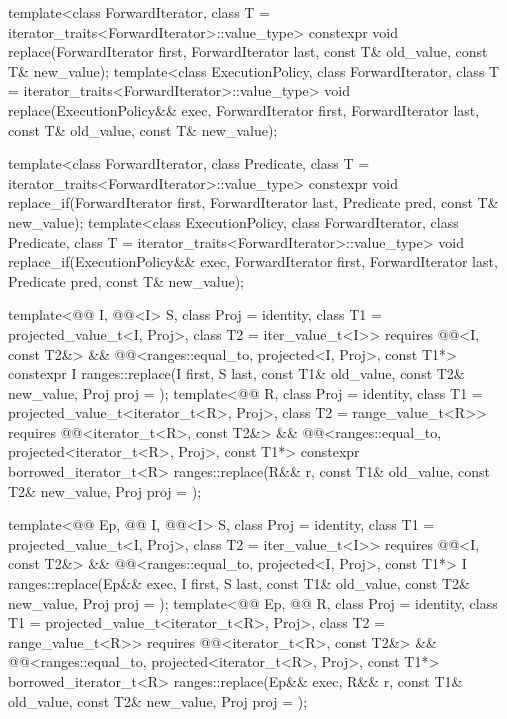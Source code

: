 %
%
\begin{itemdecl}
template<class ForwardIterator, class T = iterator_traits<ForwardIterator>::value_type>
  constexpr void replace(ForwardIterator first, ForwardIterator last,
                         const T& old_value, const T& new_value);
template<class ExecutionPolicy, class ForwardIterator,
         class T = iterator_traits<ForwardIterator>::value_type>
  void replace(ExecutionPolicy&& exec,
               ForwardIterator first, ForwardIterator last,
               const T& old_value, const T& new_value);

template<class ForwardIterator, class Predicate,
         class T = iterator_traits<ForwardIterator>::value_type>
  constexpr void replace_if(ForwardIterator first, ForwardIterator last,
                            Predicate pred, const T& new_value);
template<class ExecutionPolicy, class ForwardIterator, class Predicate,
         class T = iterator_traits<ForwardIterator>::value_type>
  void replace_if(ExecutionPolicy&& exec,
                  ForwardIterator first, ForwardIterator last,
                  Predicate pred, const T& new_value);

template<@@ I, @@<I> S, class Proj = identity,
         class T1 = projected_value_t<I, Proj>, class T2 = iter_value_t<I>>
  requires @@<I, const T2&> &&
           @@<ranges::equal_to, projected<I, Proj>, const T1*>
  constexpr I
    ranges::replace(I first, S last, const T1& old_value, const T2& new_value, Proj proj = {});
template<@@ R, class Proj = identity,
         class T1 = projected_value_t<iterator_t<R>, Proj>, class T2 = range_value_t<R>>
  requires @@<iterator_t<R>, const T2&> &&
           @@<ranges::equal_to, projected<iterator_t<R>, Proj>, const T1*>
  constexpr borrowed_iterator_t<R>
    ranges::replace(R&& r, const T1& old_value, const T2& new_value, Proj proj = {});

template<@@ Ep, @@ I, @@<I> S,
         class Proj = identity, class T1 = projected_value_t<I, Proj>, class T2 = iter_value_t<I>>
  requires @@<I, const T2&> &&
           @@<ranges::equal_to, projected<I, Proj>, const T1*>
  I ranges::replace(Ep&& exec, I first, S last,
                    const T1& old_value, const T2& new_value, Proj proj = {});
template<@@ Ep, @@ R, class Proj = identity,
         class T1 = projected_value_t<iterator_t<R>, Proj>, class T2 = range_value_t<R>>
  requires @@<iterator_t<R>, const T2&> &&
           @@<ranges::equal_to,
                                     projected<iterator_t<R>, Proj>, const T1*>
  borrowed_iterator_t<R>
    ranges::replace(Ep&& exec, R&& r, const T1& old_value, const T2& new_value,
                    Proj proj = {});


\end{itemdecl}
